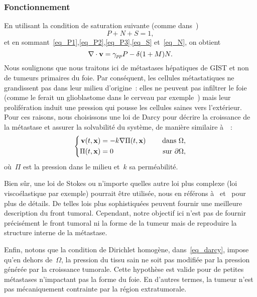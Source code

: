 \documentclass[main.tex]{subfiles}
\begin{document}
\subsubsection{Fonctionnement}

En utilisant la condition de saturation suivante 
(comme dans~\cite{ambrosi2002})
\begin{equation}\label{eq_saturation}
P+N+S=1,
\end{equation}
et en sommant~\eqref{eq_P1},\eqref{eq_P2},\eqref{eq_P3},\eqref{eq_S} et~\eqref{eq_N},
on obtient 
\begin{equation}\label{eq_divv}
\nabla\cdot \mathbf{v} = \gamma_{pp} P - \delta (1+M)N.
\end{equation}
Nous soulignons que nous traitons ici de métastases hépatiques de GIST et non de tumeurs primaires du foie. Par conséquent, les cellules métastatiques ne grandissent pas dans leur milieu d'origine~: elles ne peuvent pas infiltrer le foie (comme le ferait un glioblastome dans le cerveau par exemple~\cite{Fathallah2013}) mais leur prolifération induit une pression qui pousse les cellules saines vers l'extérieur. Pour ces raisons, nous choisissons une loi de Darcy pour décrire la croissance de la métastase %
et assurer la solvabilité du système, de manière similaire à~\cite{Ribba2006532}~:
\begin{equation}\label{eq_darcy}
\left\{
\begin{aligned}
\mathbf{v}(t,\mathbf{x}) &=-k\nabla \Pi(t,\mathbf{x}) & \quad \textrm{ dans }  \Omega , \\
\Pi(t,\mathbf{x}) &=0 & \quad \textrm{ sur  } \partial \Omega,
\end{aligned}
\right.
\end{equation}
où~$\Pi$ est la pression %
dans le milieu et~$k$ sa perméabilité. 

Bien sûr, une loi de Stokes ou n'importe quelles autre loi plus complexe (loi viscoélastique par exemple) pourrait être utilisée, nous en référons à~\cite{Bresch2009}  et~\cite{ambrosi2002,byrne2003} pour plus de détails. 
De telles lois plus sophistiquées %
peuvent fournir une meilleure description du front tumoral. Cependant, notre objectif ici n'est pas de fournir précisément le front tumoral ni la forme de la tumeur mais de reproduire la structure interne de la métastase.


Enfin, notons que la condition de Dirichlet homogène, dans~\eqref{eq_darcy}, impose qu'en dehors de~$\Omega$, la pression du tissu sain ne soit pas modifiée par la pression générée par la croissance tumorale. Cette hypothèse est valide pour de petites métastases n'impactant pas la forme du foie. En d'autres termes, la tumeur n'est pas mécaniquement contrainte par la région extratumorale. 
\end{document}
